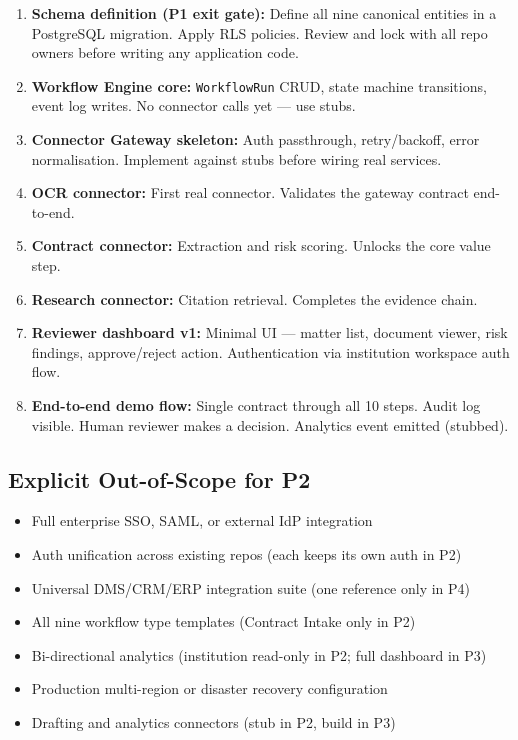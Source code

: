 \documentclass[10pt, a4paper]{article}
\newcommand{\code}[1]{{\monofont\color{TealDk}\small\texttt{#1}}}
\begin{document}
\begin{enumerate}
  \item \textbf{Schema definition (P1 exit gate):} Define all nine canonical entities in a
    PostgreSQL migration. Apply RLS policies. Review and lock with all repo owners before
    writing any application code.
  \item \textbf{Workflow Engine core:} \code{WorkflowRun} CRUD, state machine transitions,
    event log writes. No connector calls yet — use stubs.
  \item \textbf{Connector Gateway skeleton:} Auth passthrough, retry/backoff, error normalisation.
    Implement against stubs before wiring real services.
  \item \textbf{OCR connector:} First real connector. Validates the gateway contract end-to-end.
  \item \textbf{Contract connector:} Extraction and risk scoring. Unlocks the core value step.
  \item \textbf{Research connector:} Citation retrieval. Completes the evidence chain.
  \item \textbf{Reviewer dashboard v1:} Minimal UI — matter list, document viewer, risk findings,
    approve/reject action. Authentication via institution workspace auth flow.
  \item \textbf{End-to-end demo flow:} Single contract through all 10 steps. Audit log visible.
    Human reviewer makes a decision. Analytics event emitted (stubbed).
\end{enumerate}

\subsection{Explicit Out-of-Scope for P2}

\begin{itemize}
  \item Full enterprise SSO, SAML, or external IdP integration
  \item Auth unification across existing repos (each keeps its own auth in P2)
  \item Universal DMS/CRM/ERP integration suite (one reference only in P4)
  \item All nine workflow type templates (Contract Intake only in P2)
  \item Bi-directional analytics (institution read-only in P2; full dashboard in P3)
  \item Production multi-region or disaster recovery configuration
  \item Drafting and analytics connectors (stub in P2, build in P3)
\end{itemize}
\end{document}
